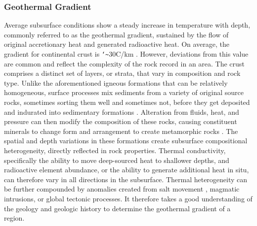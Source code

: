 \subsubsection{Geothermal Gradient}\label{ch2:geotherm}
Average subsurface conditions show a steady increase in temperature with depth, commonly referred to as the geothermal gradient, sustained by the flow of original accretionary heat and generated radioactive heat. On average, the gradient for continental crust is \texttt{\char`\~}30\textdegree C/km \citep[~p. 209]{press_understanding_2004}. However, deviations from this value are common and reflect the complexity of the rock record in an area. The crust comprises a distinct set of layers, or strata, that vary in composition and rock type. Unlike the aforementioned igneous formations that can be relatively homogeneous, surface processes mix sediments from a variety of original source rocks, sometimes sorting them well and sometimes not, before they get deposited and indurated into sedimentary formations \citep[~p. 164-168]{press_understanding_2004}. Alteration from fluids, heat, and pressure can then modify the composition of these rocks, causing constituent minerals to change form and arrangement to create metamorphic rocks \citep[~p. 195-205]{press_understanding_2004}. The spatial and depth variations in these formations create subsurface compositional heterogeneity, directly reflected in rock properties. Thermal conductivity, specifically the ability to move deep-sourced heat to shallower depths, and radioactive element abundance, or the ability to generate additional heat in situ, can therefore vary in all directions in the subsurface. Thermal heterogeneity can be further compounded by anomalies created from salt movement \citep[~p. 164-168]{press_understanding_2004}, magmatic intrusions, or global tectonic processes. It therefore takes a good understanding of the geology and geologic history to determine the geothermal gradient of a region.
